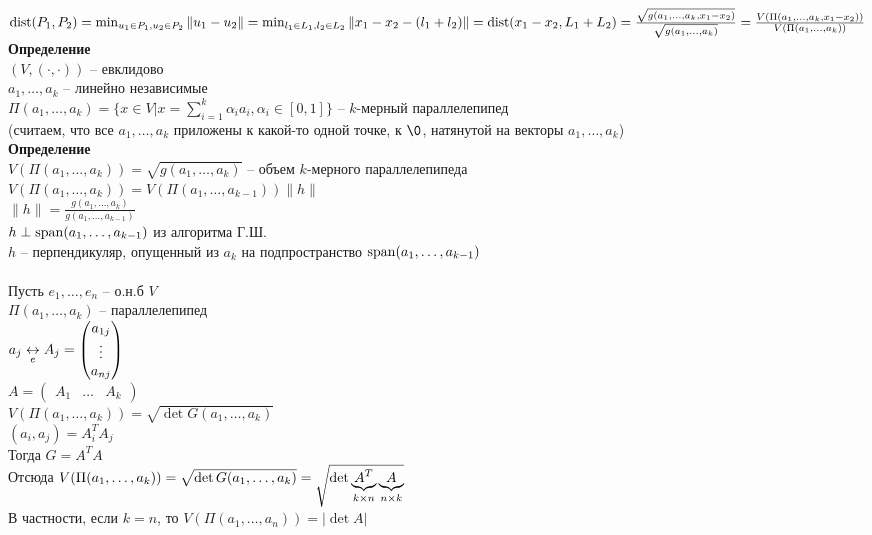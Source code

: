 \documentclass[12pt]{article}
\begin{document}
$\dist(P_1, P_2) = \min_{u_1\in P_1, u_2 \in P_2} \|u_1 - u_2\| = \min_{l_1 \in L_1, l_2 \in L_2} \|x_1 - x_2 - (l_1 + l_2)\| = \dist(x_1 - x_2, L_1 + L_2) = \frac{\sqrt{g(a_1, \ldots, a_k, x_1-x_2)}}{\sqrt{g(a_1, \ldots, a_k)}} = \frac{V(\Pi(a_1, \ldots, a_k, x_1-x_2))}{V(\Pi(a_1, \ldots, a_k))}$\\
\textbf{Определение}\\
$(V, (\cdot, \cdot))$ -- евклидово\\
$a_1, \ldots, a_k$ -- линейно независимые\\
$\Pi(a_1, \ldots, a_k) = \{x \in V | x = \sum_{i=1}^k \alpha_i a_i, \alpha_i \in [0, 1]\}$ -- $k$-мерный параллелепипед\\
(считаем, что все $a_1, \ldots, a_k$ приложены к какой-то одной точке, к $\0$, натянутой на векторы $a_1, \ldots, a_k$)\\
\textbf{Определение}\\
$V(\Pi(a_1, \ldots, a_k)) = \sqrt{g(a_1, \ldots, a_k)}$ -- объем $k$-мерного параллелепипеда\\
$V(\Pi(a_1, \ldots, a_k)) = V(\Pi(a_1, \ldots, a_{k-1}))\|h\|$\\
$\|h\| = \frac{g(a_1, \ldots, a_k)}{g(a_1, \ldots, a_{k-1})}$\\
$h \perp \span(a_1, \ldots, a_{k-1})$ из алгоритма Г.Ш.\\
$h$ -- перпендикуляр, опущенный из $a_k$ на подпространство $\span(a_1, \ldots, a_{k-1})$\\\\
Пусть $e_1, \ldots, e_n$ -- о.н.б $V$\\
$\Pi(a_1, \ldots, a_k)$ -- параллелепипед\\
$a_j \us e\lrto A_j = \begin{pmatrix}
    a_{1j}\\\vdots\\a_{nj}
\end{pmatrix}$\\
$A = \begin{pmatrix}
    A_1 & \ldots & A_k
\end{pmatrix}$\\
$V(\Pi(a_1, \ldots, a_k)) = \sqrt{\det G(a_1, \ldots, a_k)}$\\
$(a_i, a_j) = A_i^T A_j$\\
Тогда $G = A^TA$\\
Отсюда $V(\Pi(a_1, \ldots, a_k)) = \sqrt{\det G(a_1, \ldots, a_k)} = \sqrt{\det \ub{k\times n}{A^T} \ub{n\times k}A}$\\
В частности, если $k = n$, то $V(\Pi(a_1, \ldots, a_n)) = |\det A|$\\
\end{document}
